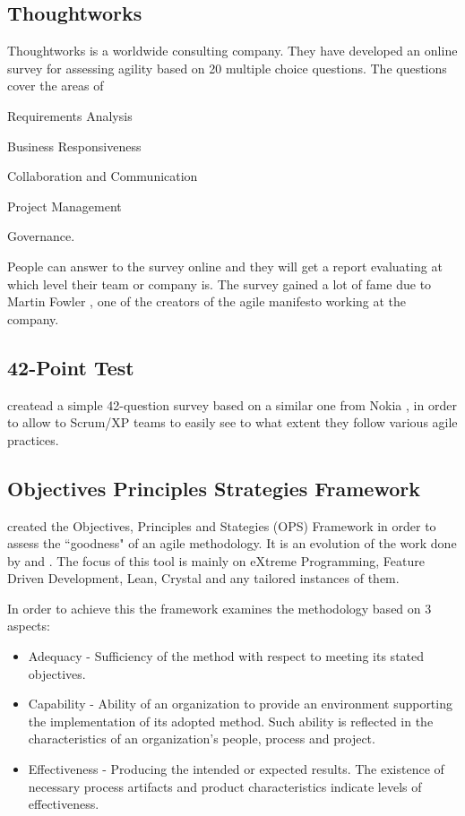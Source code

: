 \subsection{Thoughtworks} %
Thoughtworks \cite{thoughtworks} is a worldwide consulting company. They have developed an online survey for assessing agility based on 20 multiple choice questions. The questions cover the areas of 
\begin{inparaenum} [a\upshape)]
	\item Requirements Analysis
	\item Business Responsiveness
	\item Collaboration and Communication
	\item Project Management
	\item Governance.
\end{inparaenum}
People can answer to the survey online and they will get a report evaluating at which level their team or company is. The survey gained a lot of fame due to Martin Fowler \cite{martin_fowler}, one of the creators of the agile manifesto working at the company.

\subsection{42-Point Test}
\citet{42points} createad a simple 42-question survey based on a similar one from Nokia \cite{nokia}, in order to allow to Scrum/XP teams to easily see to what extent they follow various agile practices.

\subsection{Objectives Principles Strategies Framework}
\label{subsec:ops}
\citet{sventha_dissertation} created the Objectives, Principles and Stategies (OPS) Framework in order to assess the ``goodness" of an agile methodology. It is an evolution of the work done by \citet{2604} and \citet{sidky_dissertation}. The focus of this tool is mainly on eXtreme Programming, Feature Driven Development, Lean, Crystal and any tailored instances of them.

In order to achieve this the framework examines the methodology based on 3 aspects:
\begin{itemize}
\item Adequacy - Sufficiency of the method with respect to meeting its stated objectives.
\item Capability - Ability of an organization to provide an environment supporting the implementation of its adopted method. Such ability is reflected in the characteristics of an organization's people, process
and project.
\item Effectiveness - Producing the intended or expected results. The existence of necessary process artifacts and product characteristics indicate levels of effectiveness.
\end{itemize}

